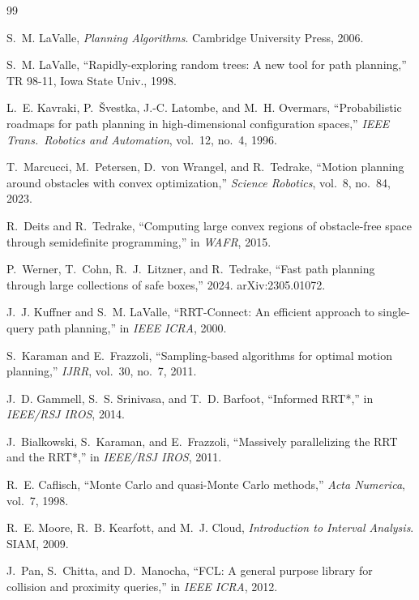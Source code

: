 \documentclass[11pt,a4paper]{article}
\begin{document}

\begin{thebibliography}{99}

S.~M. LaValle, \emph{Planning Algorithms}. Cambridge University Press, 2006.

S.~M. LaValle, ``Rapidly-exploring random trees: A new tool for path planning,'' TR 98-11, Iowa State Univ., 1998.

L.~E. Kavraki, P.~\v{S}vestka, J.-C. Latombe, and M.~H. Overmars, ``Probabilistic roadmaps for path planning in high-dimensional configuration spaces,'' \emph{IEEE Trans.\ Robotics and Automation}, vol.~12, no.~4, 1996.

T.~Marcucci, M.~Petersen, D.~von Wrangel, and R.~Tedrake, ``Motion planning around obstacles with convex optimization,'' \emph{Science Robotics}, vol.~8, no.~84, 2023.

R.~Deits and R.~Tedrake, ``Computing large convex regions of obstacle-free space through semidefinite programming,'' in \emph{WAFR}, 2015.

P.~Werner, T.~Cohn, R.~J.~Litzner, and R.~Tedrake, ``Fast path planning through large collections of safe boxes,'' 2024. arXiv:2305.01072.

J.~J. Kuffner and S.~M. LaValle, ``RRT-Connect: An efficient approach to single-query path planning,'' in \emph{IEEE ICRA}, 2000.

S.~Karaman and E.~Frazzoli, ``Sampling-based algorithms for optimal motion planning,'' \emph{IJRR}, vol.~30, no.~7, 2011.

J.~D. Gammell, S.~S. Srinivasa, and T.~D. Barfoot, ``Informed RRT*,'' in \emph{IEEE/RSJ IROS}, 2014.

J.~Bialkowski, S.~Karaman, and E.~Frazzoli, ``Massively parallelizing the RRT and the RRT*,'' in \emph{IEEE/RSJ IROS}, 2011.

R.~E. Caflisch, ``Monte Carlo and quasi-Monte Carlo methods,'' \emph{Acta Numerica}, vol.~7, 1998.

R.~E. Moore, R.~B. Kearfott, and M.~J. Cloud, \emph{Introduction to Interval Analysis}. SIAM, 2009.

J.~Pan, S.~Chitta, and D.~Manocha, ``FCL: A general purpose library for collision and proximity queries,'' in \emph{IEEE ICRA}, 2012.


\end{thebibliography}
\end{document}

